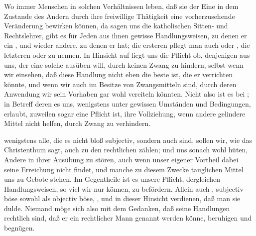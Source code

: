 \begin{aufza}
\item Wo immer Menschen in solchen Verhältnissen leben, daß sie der Eine in dem Zustande des Andern durch ihre freiwillige Thätigkeit eine vorherzusehende Veränderung bewirken können, da sagen uns die katholischen Sitten- und Rechtslehrer, gibt es für Jeden aus ihnen gewisse Handlungsweisen, zu denen er ein , und wieder andere, zu denen er  hat; die ersteren pflegt man auch  oder , die letzteren  oder  zu nennen. In Hinsicht auf  liegt uns die Pflicht ob, denjenigen aus uns, der eine solche ausüben will, durch keinen Zwang zu hindern, selbst wenn wir einsehen, daß diese Handlung nicht eben die beste ist, die er verrichten könnte, und wenn wir auch im Besitze von Zwangsmitteln sind, durch deren Anwendung wir sein Vorhaben gar wohl vereiteln könnten. Nicht also ist es bei ; in Betreff deren es uns, wenigstens unter gewissen Umständen und Bedingungen, erlaubt, zuweilen sogar eine Pflicht ist, ihre Vollziehung, wenn andere gelindere Mittel nicht helfen, durch Zwang zu verhindern.
\item {} wenigstens alle, die es nicht bloß subjectiv, sondern auch  sind, sollen wir, wie das Christenthum sagt, auch zu den rechtlichen zählen; und uns sonach wohl hüten, Andere in ihrer Ausübung zu stören, auch wenn unser eigener Vortheil dabei seine Erreichung nicht findet, und manche zu diesem Zwecke tauglichen Mittel uns zu Gebote stehen. Im Gegentheile ist es unsere Pflicht, dergleichen Handlungsweisen, so viel wir nur können, zu befördern. Allein auch , subjectiv böse sowohl als objectiv böse, , und in dieser Hinsicht verdienen, daß man sie dulde. Niemand möge sich also mit dem Gedanken, daß seine Handlungen rechtlich sind, daß er ein rechtlicher Mann genannt werden könne, beruhigen und begnügen.

\end{aufza}
